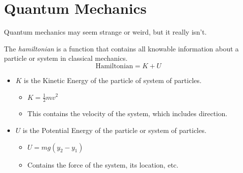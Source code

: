\section{Quantum Mechanics}\label{sec:Quantum Mech}
Quantum mechanics may seem strange or weird, but it really isn't.
\begin{definition}[Hamiltonian]\label{def:Hamiltonian}
  The \emph{hamiltonian} is a function that contains all knowable information about a particle or system in classical mechanics.
  \begin{equation}\label{eq:Hamiltonian}
    \text{Hamiltonian} = K+U
  \end{equation}
  \begin{itemize}[noitemsep, nolistsep]
  \item $K$ is the Kinetic Energy of the particle of system of particles.
    \begin{itemize}[noitemsep, nolistsep]
    \item $K = \frac{1}{2} mv^{2}$
    \item This contains the velocity of the system, which includes direction.
    \end{itemize}
  \item $U$ is the Potential Energy of the particle or system of particles.
    \begin{itemize}[noitemsep, nolistsep]
    \item $U = mg \left( y_{2} - y_{1} \right)$
    \item Contains the force of the system, its location, etc.
    \end{itemize}
  \end{itemize}
\end{definition}

